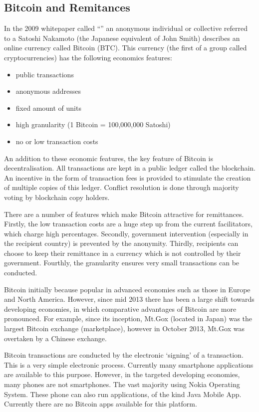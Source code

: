 \documentclass[a4paper]{report}\usepackage{graphicx, color}
\begin{document}
\begin{refsection}
\chapter{Bitcoin and Remitances}
\label{bitcoin}
In the 2009 whitepaper \parencite{nakamoto2008bitcoin} called ``'' an anonymous individual or collective referred to a Satoshi Nakamoto (the Japanese equivalent of John Smith) describes an online currency called Bitcoin (BTC). This currency (the first of a group called cryptocurrencies) has the following economics features:

\begin{itemize}
\item public transactions
\item anonymous addresses
\item fixed amount of units
\item high granularity (1 Bitcoin = 100,000,000 Satoshi)
\item no or low transaction costs
\end{itemize}

An addition to these economic features, the key feature of Bitcoin is decentralisation. All transactions are kept in a public ledger called the blockchain. An incentive in the form of transaction fees is provided to stimulate the creation of multiple copies of this ledger. Conflict resolution is done through majority voting by blockchain copy holders.

There are a number of features which make Bitcoin attractive for remittances. Firstly, the low transaction costs are a huge step up from the current facilitators, which charge high percentages. Secondly, government intervention (especially in the recipient country) is prevented by the anonymity. Thirdly, recipients can choose to keep their remittance in a currency which is not controlled by their government. Fourthly, the granularity ensures very small transactions can be conducted.

Bitcoin initially because popular in advanced economies such as those in Europe and North America. However, since mid 2013 there has been a large shift towards developing economies, in which comparative advantages of Bitcoin are more pronounced. For example, since its inception, Mt.Gox (located in Japan) was the largest Bitcoin exchange (marketplace), however in October 2013, Mt.Gox was overtaken by a Chinese exchange.

Bitcoin transactions are conducted by the electronic `signing' of a transaction. This is a very simple electronic process. Currently many smartphone applications are available to this purpose. However, in the targeted developing economies, many phones are not smartphones. The vast majority using Nokia Operating System. These phone can also run applications, of the kind Java Mobile App. Currently there are no Bitcoin apps available for this platform.


\end{refsection}
\end{document}
